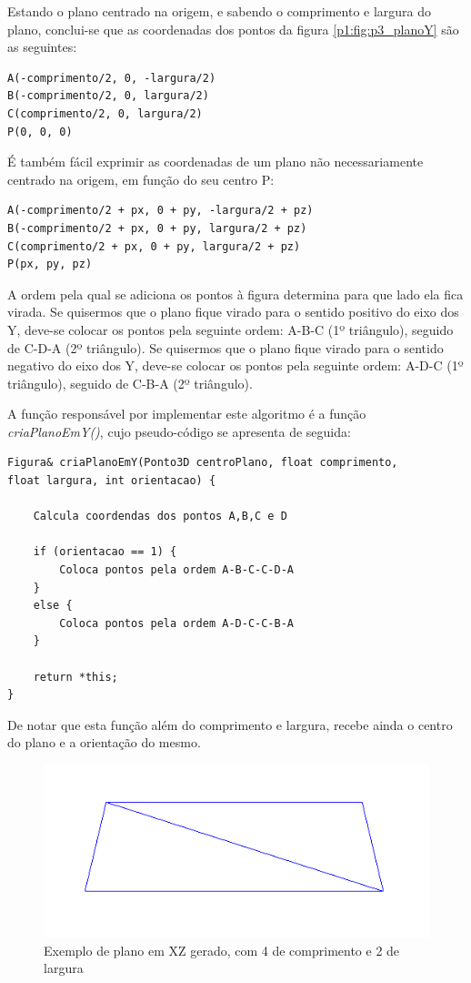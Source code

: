 Estando o plano centrado na origem, e sabendo o comprimento e largura do plano, conclui-se que as coordenadas dos pontos da figura \ref{p1:fig:p3_planoY} são as seguintes:

\begin{Verbatim}
A(-comprimento/2, 0, -largura/2)
B(-comprimento/2, 0, largura/2)
C(comprimento/2, 0, largura/2)
P(0, 0, 0)
\end{Verbatim}

É também fácil exprimir as coordenadas de um plano não necessariamente centrado na origem, em função do seu centro P:

\begin{Verbatim}
A(-comprimento/2 + px, 0 + py, -largura/2 + pz)
B(-comprimento/2 + px, 0 + py, largura/2 + pz)
C(comprimento/2 + px, 0 + py, largura/2 + pz)
P(px, py, pz)
\end{Verbatim}

A ordem pela qual se adiciona os pontos à figura determina para que lado ela fica virada. Se quisermos que o plano fique virado para o sentido positivo do eixo dos Y, deve-se colocar os pontos pela seguinte ordem: A-B-C (1º triângulo), seguido de C-D-A (2º triângulo). Se quisermos que o plano fique virado para o sentido negativo do eixo dos Y, deve-se colocar os pontos pela seguinte ordem: A-D-C (1º triângulo), seguido de C-B-A (2º triângulo).

A função responsável por implementar este algoritmo é a função \textit{criaPlanoEmY()}, cujo pseudo-código se apresenta de seguida:

\begin{Verbatim}
Figura& criaPlanoEmY(Ponto3D centroPlano, float comprimento, 
float largura, int orientacao) {

	Calcula coordendas dos pontos A,B,C e D
	
	if (orientacao == 1) {
		Coloca pontos pela ordem A-B-C-C-D-A
	}
	else {
		Coloca pontos pela ordem A-D-C-C-B-A
	}
	
	return *this;
}
\end{Verbatim}

De notar que esta função além do comprimento e largura, recebe ainda o centro do plano e a orientação do mesmo.

\begin{figure}[<+htpb+>]
	\centering
	\includegraphics[scale=0.5]{imagens/p3_plano_4_2.png}
	\caption{Exemplo de plano em XZ gerado, com 4 de comprimento e 2 de largura}
	\label{p1:fig:p3_plano_4_2}
\end{figure}

